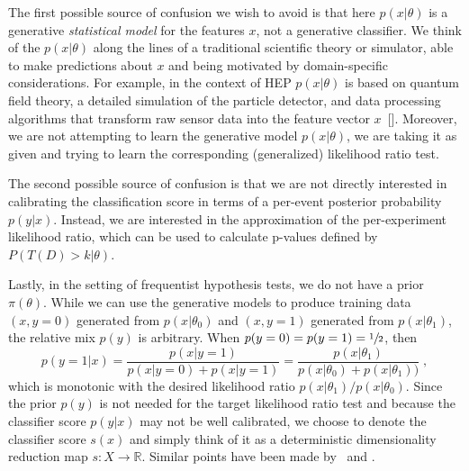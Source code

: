 \documentclass[aoas,preprint]{imsart}
\newcommand{\citek}[1]{[\cite{#1}]}
\numberwithin{equation}{section}
\theoremstyle{plain}
\begin{document}
The first possible source of confusion we wish to avoid is that here $p(x|\theta)$  is a generative \textit{statistical model} for the features $x$, not a generative classifier. We think of the  $p(x|\theta)$ along the lines of a traditional scientific theory or simulator, able to make predictions about $x$ and being motivated by domain-specific considerations. For example, in the context of HEP $p(x|\theta)$ is based on quantum field theory, a detailed simulation of the particle detector, and data processing algorithms that transform raw sensor data into the feature vector $x$~\citek{Sjostrand:2006za,Agostinelli:2002hh}.  
Moreover, we are not attempting to learn the generative model $p(x|\theta)$, we are taking it as given and trying to learn the corresponding (generalized) likelihood ratio test.

The second possible source of confusion is that 
we are not directly interested in calibrating the classification score in terms of a per-event posterior probability $p(y|x)$. 
Instead, we are interested in the approximation of the per-experiment likelihood ratio, which can be used to calculate p-values defined by $P(T(D) > k |\theta)$.
%


Lastly, in the setting of frequentist hypothesis tests, we do not have a prior $\pi(\theta)$. 
While we can use the generative models to produce training data $(x,y=0)$ generated 
from $p(x|\theta_0)$ and $(x,y=1)$ generated from $p(x|\theta_1)$, the relative mix $p(y)$ 
is arbitrary.  When $p(y=0)=p(y=1)=\sfrac{1}{2}$, then 
\begin{equation}
p(y=1 | x) = \frac{p(x|y=1)}{p(x|y=0)+p(x|y=1)} = \frac{p(x|\theta_1)}{p(x|\theta_0)+p(x|\theta_1))} \;,
\end{equation}
which is monotonic with the desired likelihood ratio $p(x|\theta_1)/p(x|\theta_0)$.
Since the prior $p(y)$ is not needed for the target likelihood ratio test and because the classifier score $p(y|x)$ may not be well calibrated, we choose to denote the classifier score $s(x)$ and simply think of it as a deterministic dimensionality reduction map $s: X \to \mathbb{R}$.  Similar points have been made by~\cite{ClaytonScott} and \cite{Neal:2007zz}.
\end{document}
